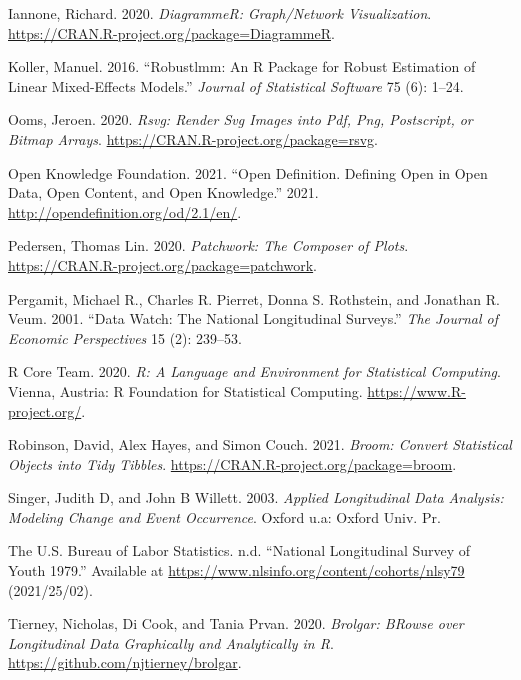 \documentclass{article}
\begin{document}
\leavevmode\hypertarget{ref-DiagrammeR}{}%
Iannone, Richard. 2020. \emph{DiagrammeR: Graph/Network Visualization}. \url{https://CRAN.R-project.org/package=DiagrammeR}.

\leavevmode\hypertarget{ref-KollerManuel2016rARP}{}%
Koller, Manuel. 2016. ``Robustlmm: An R Package for Robust Estimation of Linear Mixed-Effects Models.'' \emph{Journal of Statistical Software} 75 (6): 1--24.

\leavevmode\hypertarget{ref-rsvg}{}%
Ooms, Jeroen. 2020. \emph{Rsvg: Render Svg Images into Pdf, Png, Postscript, or Bitmap Arrays}. \url{https://CRAN.R-project.org/package=rsvg}.

\leavevmode\hypertarget{ref-opendata}{}%
Open Knowledge Foundation. 2021. ``Open Definition. Defining Open in Open Data, Open Content, and Open Knowledge.'' 2021. \url{http://opendefinition.org/od/2.1/en/}.

\leavevmode\hypertarget{ref-patchwork}{}%
Pedersen, Thomas Lin. 2020. \emph{Patchwork: The Composer of Plots}. \url{https://CRAN.R-project.org/package=patchwork}.

\leavevmode\hypertarget{ref-MichaelRPergamit2001DWTN}{}%
Pergamit, Michael R., Charles R. Pierret, Donna S. Rothstein, and Jonathan R. Veum. 2001. ``Data Watch: The National Longitudinal Surveys.'' \emph{The Journal of Economic Perspectives} 15 (2): 239--53.

\leavevmode\hypertarget{ref-R}{}%
R Core Team. 2020. \emph{R: A Language and Environment for Statistical Computing}. Vienna, Austria: R Foundation for Statistical Computing. \url{https://www.R-project.org/}.

\leavevmode\hypertarget{ref-broom}{}%
Robinson, David, Alex Hayes, and Simon Couch. 2021. \emph{Broom: Convert Statistical Objects into Tidy Tibbles}. \url{https://CRAN.R-project.org/package=broom}.

\leavevmode\hypertarget{ref-SingerJudithD2003Alda}{}%
Singer, Judith D, and John B Willett. 2003. \emph{Applied Longitudinal Data Analysis: Modeling Change and Event Occurrence}. Oxford u.a: Oxford Univ. Pr.

\leavevmode\hypertarget{ref-nlsy79}{}%
The U.S. Bureau of Labor Statistics. n.d. ``National Longitudinal Survey of Youth 1979.'' Available at \url{https://www.nlsinfo.org/content/cohorts/nlsy79} (2021/25/02).

\leavevmode\hypertarget{ref-brolgar}{}%
Tierney, Nicholas, Di Cook, and Tania Prvan. 2020. \emph{Brolgar: BRowse over Longitudinal Data Graphically and Analytically in R}. \url{https://github.com/njtierney/brolgar}.
\end{document}
